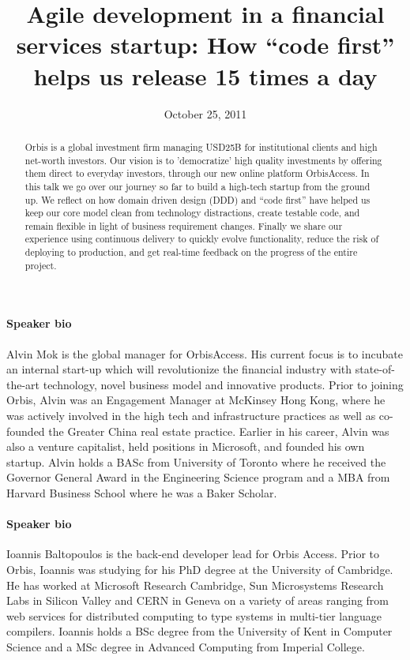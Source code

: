 \documentclass{article}
\begin{document}
\title{Agile development in a financial services startup: How ``code first''
helps us release 15 times a day}
\date{October 25, 2011}

\maketitle

\begin{abstract}
Orbis is a global investment firm managing USD25B for institutional
clients and high net-worth investors.
%
Our vision is to 'democratize' high quality investments by offering
them direct to everyday investors, through our new online platform
OrbisAccess.
%
In this talk we go over our journey so far to build a high-tech
startup from the ground up.
%
We reflect on how domain driven design (DDD) and ``code first'' have
helped us keep our core model clean from technology distractions,
create testable code, and remain flexible in light of business
requirement changes.
%
Finally we share our experience using continuous delivery to quickly
evolve functionality, reduce the risk of deploying to production, and
get real-time feedback on the progress of the entire project.
\end{abstract}




\paragraph{Speaker bio} 
Alvin Mok is the global manager for OrbisAccess. 
%
His current focus is to incubate an internal start-up which will
revolutionize the financial industry with state-of-the-art technology,
novel business model and innovative products.
%
Prior to joining Orbis, Alvin was an Engagement Manager at McKinsey
Hong Kong, where he was actively involved in the high tech and
infrastructure practices as well as co-founded the Greater China real
estate practice.
%
Earlier in his career, Alvin was also a venture capitalist, held
positions in Microsoft, and founded his own startup.
%
Alvin holds a BASc from University of Toronto where he received the
Governor General Award in the Engineering Science program and a MBA
from Harvard Business School where he was a Baker Scholar.

\paragraph{Speaker bio}
Ioannis Baltopoulos is the back-end developer lead for Orbis Access.
%
Prior to Orbis, Ioannis was studying for his PhD degree at the
University of Cambridge.
%
He has worked at Microsoft Research Cambridge, Sun Microsystems
Research Labs in Silicon Valley and CERN in Geneva on a variety of
areas ranging from web services for distributed computing to type
systems in multi-tier language compilers.
%
Ioannis holds a BSc degree from the University of Kent in Computer
Science and a MSc degree in Advanced Computing from Imperial College.
\end{document}

